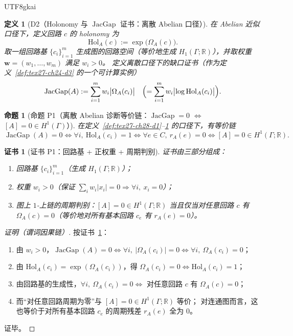 \documentclass[12pt]{article}
\newtheorem{definition}{定义}[section]
\newtheorem{proposition}{命题}[section]
\newtheorem{Certificate}{证书}[section]
\newcommand{\RR}{\mathbb{R}}
\newcommand{\JacGap}{\operatorname{JacGap}}
\begin{document}
\begin{CJK*}{UTF8}{gkai}
\begin{definition}[D2（Holonomy 与 \texorpdfstring{$\JacGap$}{JacGap} 证书：离散 Abelian 口径）]
\label{def:tex27-ch28-d2}
在 Abelian 近似口径下，定义回路 $c$ 的 holonomy 为
\[
  \mathrm{Hol}_A(c):=\exp\bigl(\Omega_A(c)\bigr).
\]
取一组回路基 $\{c_i\}_{i=1}^m$ 生成图的回路空间（等价地生成 $H_1(\Gamma;\RR)$），并取权重 $\mathbf w=(w_1,\dots,w_m)$ 满足 $w_i>0$。
定义离散口径下的缺口证书（作为定义~\ref{def:tex27-ch24-d3} 的一个可计算实例）
\[
  \JacGap(A):=\sum_{i=1}^m w_i\bigl|\Omega_A(c_i)\bigr|
  \quad\Bigl(=\sum_{i=1}^m w_i\bigl|\log\mathrm{Hol}_A(c_i)\bigr|\Bigr).
\]
\end{definition}

\begin{proposition}[命题 P1（离散 Abelian 诊断等价链：\texorpdfstring{$\JacGap=0$}{JacGap=0} $\Leftrightarrow$ \texorpdfstring{$[A]
  =0\in H^1(\Gamma)$}{[A]=0 in H1}）]
\label{prop:tex27-ch28-p1}
在定义~\ref{def:tex27-ch28-d1}--\ref{def:tex27-ch28-d2} 的口径下，有等价链
\[
  \JacGap(A)=0
  \iff
  \forall i,\ \mathrm{Hol}_A(c_i)=1
  \iff
  \forall e\in C,\ r_A(e)=0
  \iff
  [A]=0\in H^1(\Gamma;\RR).
\]
\end{proposition}

\begin{Certificate}[证书 P1：回路基 + 正权重 + 周期判别]
\label{cert:tex27-ch28-p1}
证书由三部分组成：
\begin{enumerate}
  \item 回路基 $\{c_i\}_{i=1}^m$（生成 $H_1(\Gamma;\RR)$）；
  \item 权重 $w_i>0$（保证 $\sum_i w_i|x_i|=0\Rightarrow \forall i,\ x_i=0$）；
  \item 图上 $1$-上链的周期判别：$[A]=0\in H^1(\Gamma;\RR)$ 当且仅当对任意回路 $c$ 有 $\Omega_A(c)=0$（等价地对所有基本回路 $c_e$ 有 $r_A(e)=0$）。
\end{enumerate}
\end{Certificate}

\begin{proof}[证明（谓词因果链）]
按证书~\ref{cert:tex27-ch28-p1}：
\begin{enumerate}
  \item 由 $w_i>0$，$\JacGap(A)=0 \iff \forall i,\ |\Omega_A(c_i)|=0 \iff \forall i,\ \Omega_A(c_i)=0$；
  \item 由 $\mathrm{Hol}_A(c_i)=\exp(\Omega_A(c_i))$，得 $\Omega_A(c_i)=0 \iff \mathrm{Hol}_A(c_i)=1$；
  \item 由回路基的生成性，$\forall i,\ \Omega_A(c_i)=0 \iff$ 对任意回路 $c$ 有 $\Omega_A(c)=0$；
  \item 而“对任意回路周期为零”与 $[A]=0\in H^1(\Gamma;\RR)$ 等价；
  对连通图而言，这也等价于对所有基本回路 $c_e$ 的周期残差 $r_A(e)$ 全为 $0$。
\end{enumerate}
证毕。
\end{proof}


\end{CJK*}
\end{document}

